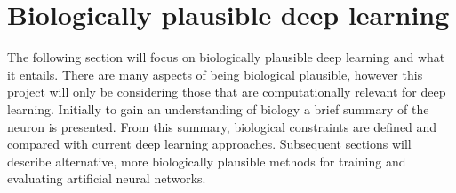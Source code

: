\documentclass[a4paper,11pt]{article}
\begin{document}
\newpage

\section{Biologically plausible deep learning}
The following section will focus on biologically plausible deep learning and what it entails. There are many aspects of being biological plausible, however this project will only be considering those that are computationally relevant for deep learning. Initially to gain an understanding of biology a brief summary of the neuron is presented. From this summary, biological constraints are defined and compared with current deep learning approaches. Subsequent sections will describe alternative, more biologically plausible methods for training and evaluating artificial neural networks. 
\end{document}

